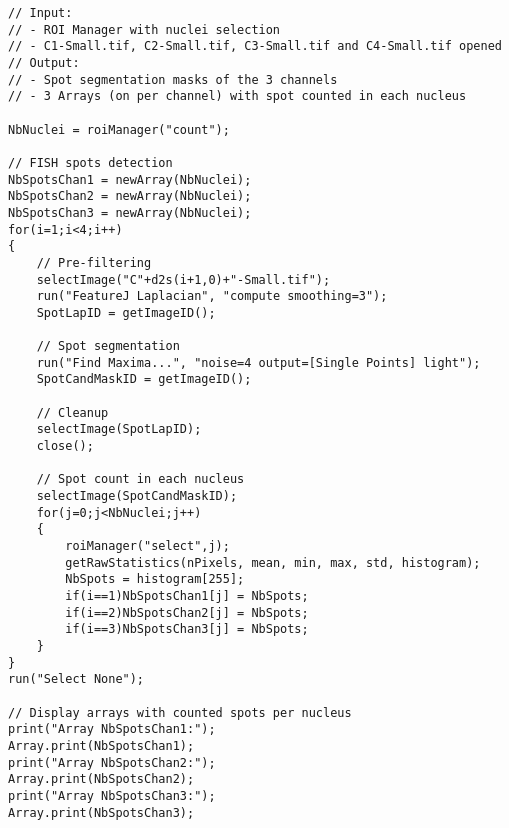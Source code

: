 \begin{lstlisting}[linerange={1-6}]
// Input: 
// - ROI Manager with nuclei selection
// - C1-Small.tif, C2-Small.tif, C3-Small.tif and C4-Small.tif opened
// Output: 
// - Spot segmentation masks of the 3 channels
// - 3 Arrays (on per channel) with spot counted in each nucleus

NbNuclei = roiManager("count");

// FISH spots detection
NbSpotsChan1 = newArray(NbNuclei);
NbSpotsChan2 = newArray(NbNuclei);
NbSpotsChan3 = newArray(NbNuclei);
for(i=1;i<4;i++)
{
	// Pre-filtering
	selectImage("C"+d2s(i+1,0)+"-Small.tif");
	run("FeatureJ Laplacian", "compute smoothing=3");
	SpotLapID = getImageID();
	
	// Spot segmentation
	run("Find Maxima...", "noise=4 output=[Single Points] light");
	SpotCandMaskID = getImageID();

	// Cleanup
	selectImage(SpotLapID);
	close();
	
	// Spot count in each nucleus
	selectImage(SpotCandMaskID);
	for(j=0;j<NbNuclei;j++)
	{ 	
		roiManager("select",j);
		getRawStatistics(nPixels, mean, min, max, std, histogram);
		NbSpots = histogram[255];
		if(i==1)NbSpotsChan1[j] = NbSpots;
		if(i==2)NbSpotsChan2[j] = NbSpots;
		if(i==3)NbSpotsChan3[j] = NbSpots;
	}	
}
run("Select None");

// Display arrays with counted spots per nucleus
print("Array NbSpotsChan1:");
Array.print(NbSpotsChan1);
print("Array NbSpotsChan2:");
Array.print(NbSpotsChan2);
print("Array NbSpotsChan3:");
Array.print(NbSpotsChan3);

\end{lstlisting}